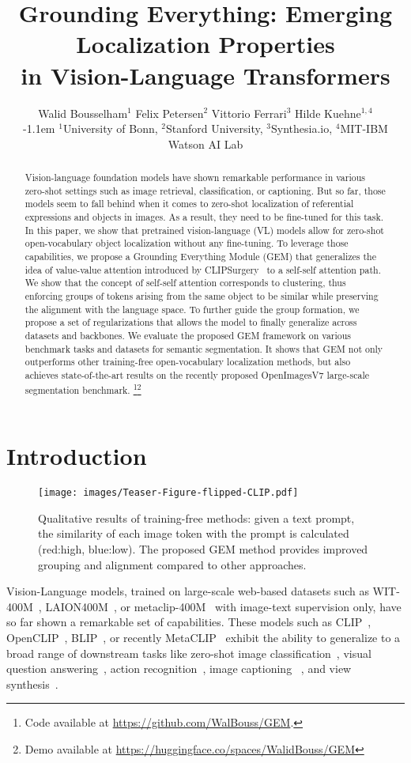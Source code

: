\documentclass[10pt,twocolumn,letterpaper]{article}
\title{Grounding Everything: Emerging Localization Properties \\ in Vision-Language Transformers}
\author{Walid Bousselham$^1$ \quad
    Felix Petersen$^2$  \quad
    Vittorio Ferrari$^{3}$  \quad
    Hilde Kuehne$^{1,4}$ \\
    \kern-1.1em\small{
    $^1$University of Bonn,
    $^2$Stanford University, 
    $^3$Synthesia.io, 
    $^4$MIT-IBM Watson AI Lab
    } \\
}
\begin{document}
\maketitle
\begin{abstract}
Vision-language foundation models have shown remarkable performance in various zero-shot settings such as image retrieval,  classification, or captioning. But so far, those models seem to fall behind when it comes to zero-shot localization of referential expressions and objects in images. As a result, they need to be fine-tuned for this task.
In this paper, we show that pretrained vision-language (VL) models allow for zero-shot open-vocabulary object localization without any fine-tuning. To leverage those capabilities, we propose a Grounding Everything Module (GEM) that generalizes the idea of value-value attention introduced by CLIPSurgery~\citep{li2023clipsurgery} to a self-self attention path. We show that the concept of self-self attention corresponds to clustering, thus enforcing groups of tokens arising from the same object to be similar while preserving the alignment with the language space. To further guide the group formation, we propose a set of regularizations that allows the model to finally generalize across datasets and backbones. 
We evaluate the proposed GEM framework on various benchmark tasks and datasets for semantic segmentation. It shows that GEM not only outperforms other training-free open-vocabulary localization methods, but also achieves state-of-the-art results on the recently proposed OpenImagesV7 large-scale segmentation benchmark. \footnote{Code available at \url{https://github.com/WalBouss/GEM}.}\footnote{Demo available at \url{https://huggingface.co/spaces/WalidBouss/GEM}}
\end{abstract} \section{Introduction}
\label{sec:intro}
\begin{figure}[ht]
\centering \label{fig:teaser-fig}
     \texttt{[image: images/Teaser-Figure-flipped-CLIP.pdf]}
     \caption{Qualitative results of training-free methods: given a text prompt, the similarity of each image token with the prompt is calculated (red:high, blue:low). The proposed GEM method provides improved grouping and alignment compared to other approaches.}
     \label{fig:teaser}
\end{figure}
Vision-Language models, trained on large-scale web-based datasets such as WIT-400M~\citep{radford2021learning}, LAION400M~\citep{schuhmann2022laion}, or metaclip-400M~\citep{xu2023demystifying} with image-text supervision only, have so far shown a remarkable set of capabilities. These models such as CLIP~\citep{radford2021learning}, OpenCLIP~\citep{schuhmann2022laion}, BLIP~\citep{li2022blip}, or recently MetaCLIP~\citep{xu2023demystifying} exhibit the ability to generalize to a broad range of downstream tasks like zero-shot image classification~\citep{radford2021learning, jia2021scaling, cherti2023reproducible}, visual question answering~\citep{khan2022weakly}, action recognition~\citep{yuan2021florence, yu2022coca}, image captioning ~\citep{li2022blip, li2019visualbert},  and view synthesis~\citep{jain2021putting}. 
\end{document}
